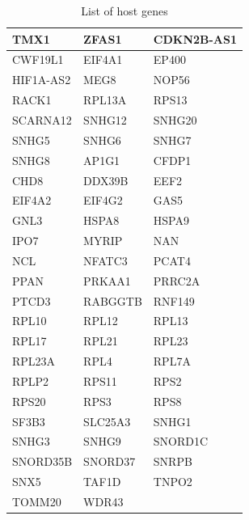\documentclass[journal]{IEEEtran}
\begin{document}
\begin{table}[h!]
    \centering
    \begin{tabularx}{\linewidth}{| X | X | X |}
        \hline
        TMX1 & ZFAS1 & CDKN2B-AS1 \\ \hline
        CWF19L1 & EIF4A1 & EP400 \\ \hline
        HIF1A-AS2 & MEG8 & NOP56 \\ \hline
        RACK1 & RPL13A & RPS13 \\ \hline
        SCARNA12 & SNHG12 & SNHG20 \\ \hline
        SNHG5 & SNHG6 & SNHG7 \\ \hline
        SNHG8 & AP1G1 & CFDP1 \\ \hline
        CHD8 & DDX39B & EEF2 \\ \hline
        EIF4A2 & EIF4G2 & GAS5 \\ \hline
        GNL3 & HSPA8 & HSPA9 \\ \hline
        IPO7 & MYRIP & NAN \\ \hline
        NCL & NFATC3 & PCAT4 \\ \hline
        PPAN & PRKAA1 & PRRC2A \\ \hline
        PTCD3 & RABGGTB & RNF149 \\ \hline
        RPL10 & RPL12 & RPL13 \\ \hline
        RPL17 & RPL21 & RPL23 \\ \hline
        RPL23A & RPL4 & RPL7A \\ \hline
        RPLP2 & RPS11 & RPS2 \\ \hline
        RPS20 & RPS3 & RPS8 \\ \hline
        SF3B3 & SLC25A3 & SNHG1 \\ \hline
        SNHG3 & SNHG9 & SNORD1C \\ \hline
        SNORD35B & SNORD37 & SNRPB \\ \hline
        SNX5 & TAF1D & TNPO2 \\ \hline
        TOMM20 & WDR43 & \\ \hline
    \end{tabularx}
\caption{List of host genes}\label{table:host_genes_list}
\end{table}
\end{document}
